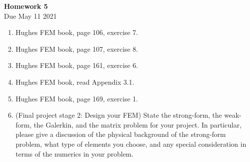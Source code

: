 \documentclass[12pt]{article}
\begin{document}
\begin{center}
\textbf{\Large
Homework 5
}\\
\normalsize Due May 11 2021





\end{center}
\begin{enumerate}
\item Hughes FEM book, page 106, exercise 7.

\item Hughes FEM book, page 107, exercise 8.

\item Hughes FEM book, page 161, exercise 6.

\item Hughes FEM book, read Appendix 3.1.

\item Hughes FEM book, page 169, exercise 1.

\item(Final project stage 2: Design your FEM) State the strong-form, the weak-form, the Galerkin, and the matrix problem for your project. In particular, please give a discussion of the physical background of the strong-form problem, what type of elements you choose, and any special consideration in terms of the numerics in your problem.


\end{enumerate}
\end{document}
